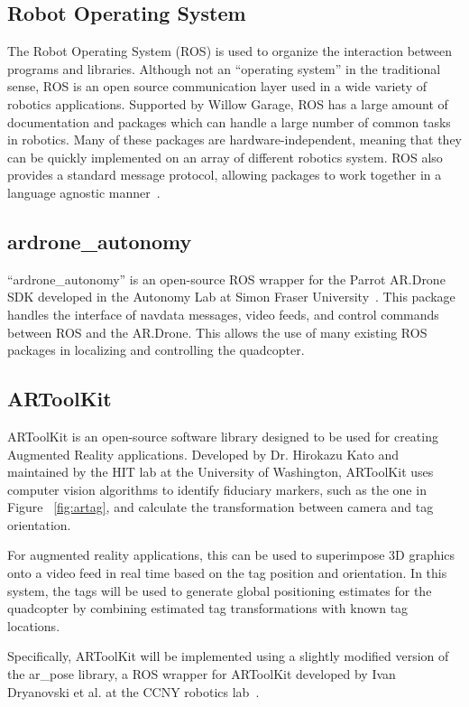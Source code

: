     \subsection{Robot Operating System}
         The Robot Operating System (ROS) is used to organize the interaction between programs and libraries. Although not an ``operating system'' in the traditional sense, ROS is an open source communication layer used in a wide variety of robotics applications. Supported by Willow Garage, ROS has a large amount of documentation and packages which can handle a large number of common tasks in robotics. Many of these packages are hardware-independent, meaning that they can be quickly implemented on an array of different robotics system. ROS also provides a standard message protocol, allowing packages to work together in a language agnostic manner~\cite{ROS}.

    \subsection{ardrone\_autonomy}
        ``ardrone\_autonomy'' is an open-source ROS wrapper for the Parrot AR.Drone SDK developed in the Autonomy Lab at Simon Fraser University~\cite{Autonomy}. This package handles the interface of navdata messages, video feeds, and control commands between ROS and the AR.Drone. This allows the use of many existing ROS packages in localizing and controlling the quadcopter.

    \subsection{ARToolKit}
        ARToolKit is an open-source software library designed to be used for creating Augmented Reality applications. Developed by Dr. Hirokazu Kato and maintained by the HIT lab at the University of Washington, ARToolKit uses computer vision algorithms to identify fiduciary markers, such as the one in Figure ~\ref{fig:artag}, and calculate the transformation between camera and tag orientation. 

        For augmented reality applications, this can be used to superimpose 3D graphics onto a video feed in real time based on the tag position and orientation. In this system, the tags will be used to generate global positioning estimates for the quadcopter by combining estimated tag transformations with known tag locations.

        Specifically, ARToolKit will be implemented using a slightly modified version of the ar\_pose library, a ROS wrapper for ARToolKit developed by Ivan Dryanovski et al. at the CCNY robotics lab~\cite{arpose}.

